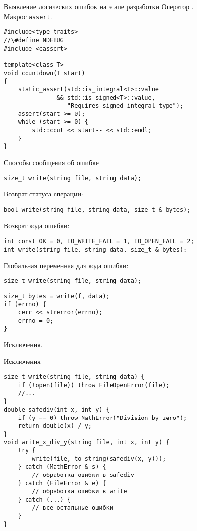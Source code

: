 \documentclass{beamer}
\begin{document}
\begin{frame}[fragile]{Выявление логических ошибок на этапе разработки}
    \fakeitem Оператор .\\
    \fakeitem Макрос \texttt{assert}.
    \begin{lstlisting}
#include<type_traits>
//\#define NDEBUG
#include <cassert>

template<class T> 
void countdown(T start) 
{
    static_assert(std::is_integral<T>::value
               && std::is_signed<T>::value, 
                  "Requires signed integral type");
    assert(start >= 0);
    while (start >= 0) {
        std::cout << start-- << std::endl;
    }
}
    \end{lstlisting}
\end{frame}

\begin{frame}[fragile]{Способы сообщения об ошибке}
\small
    \begin{lstlisting}
size_t write(string file, string data);
    \end{lstlisting}

        \pause\fakeitem Возврат статуса операции:
    \begin{lstlisting}
bool write(string file, string data, size_t & bytes);
    \end{lstlisting}

        \pause\fakeitem Возврат кода ошибки:
    \begin{lstlisting}
int const OK = 0, IO_WRITE_FAIL = 1, IO_OPEN_FAIL = 2;
int write(string file, string data, size_t & bytes);
    \end{lstlisting}

        \pause\fakeitem Глобальная переменная для кода ошибки:
    \begin{lstlisting}
size_t write(string file, string data);
    \end{lstlisting}

    \begin{lstlisting}
size_t bytes = write(f, data);
if (errno) {
    cerr << strerror(errno);
    errno = 0;
}
\end{lstlisting}
\pause\fakeitem Исключения.
\end{frame}

\begin{frame}[fragile]{Исключения}
\begin{lstlisting}
size_t write(string file, string data) {
    if (!open(file)) throw FileOpenError(file);
    //...
}
double safediv(int x, int y) {
    if (y == 0) throw MathError("Division by zero");
    return double(x) / y;
}
void write_x_div_y(string file, int x, int y) {
    try { 
        write(file, to_string(safediv(x, y)));
    } catch (MathError & s) { 
        // обработка ошибки в safediv
    } catch (FileError & e) { 
        // обработка ошибки в write
    } catch (...) { 
        // все остальные ошибки
    }
}
\end{lstlisting}
\end{frame}
\end{document}
